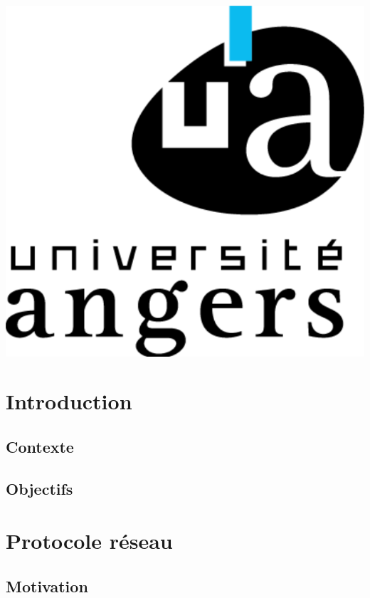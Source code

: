 \documentclass{report}
\begin{document}
\begin{titlepage}
		
	\vspace{1.5cm}
	\hspace{15cm}\includegraphics[scale = 0.1]{img/logo.png}

    
    
\end{titlepage}


\tableofcontents

\chapter{Introduction}

	\section{Contexte}
		 \label{contexte}
	
	\section{Objectifs}
		 \label{objectifs}

\chapter{Protocole réseau}
	
	\section{Motivation}
		 \label{motivation}
\end{document}

